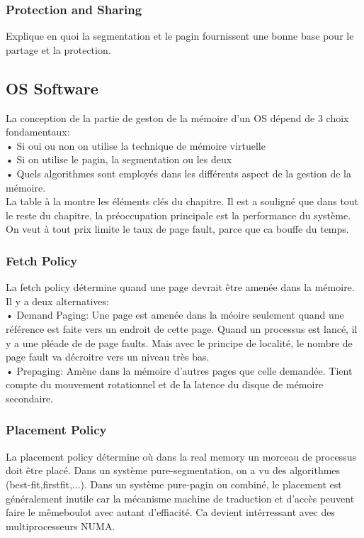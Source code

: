 \subsubsection{Protection and Sharing}
Explique en quoi la segmentation et le pagin fournissent une bonne base pour le partage et la protection.
\subsection{OS Software}
La conception de la partie de geston de la mémoire d'un OS dépend de 3 choix fondamentaux:\\
• Si oui ou non on utilise la technique de mémoire virtuelle\\
• Si on utilise le pagin, la segmentation ou les deux\\
• Quels algorithmes sont employés dans les différents aspect de la gestion de la mémoire.\\
La table à la \cite[p.~361]{stallings} montre les éléments clés du chapitre.
Il est a souligné que dans tout le reste du chapitre, la préoccupation principale est la performance du système.
On veut à tout prix limite le taux de page fault, parce que ca bouffe du temps.
\subsubsection{Fetch Policy}
La fetch policy détermine quand une page devrait être amenée dans la mémoire.
Il y a deux alternatives:\\
• Demand Paging: Une page est amenée dans la méoire seulement quand une référence est faite vers un endroit de cette page.
Quand un processus est lancé, il y a une pléade de de page faults.
Mais avec le principe de localité, le nombre de page fault va décroitre vers un niveau très bas.\\
• Prepaging: Amène dans la mémoire d'autres pages que celle demandée.
Tient compte du mouvement rotationnel et de la latence du disque de mémoire secondaire.\\
\subsubsection{Placement Policy}
La placement policy détermine où dans la real memory un morceau de processus doit être placé.
Dans un système pure-segmentation, on a vu des algorithmes (best-fit,firstfit,...).
Dans un système pure-pagin ou combiné, le placement est généralement inutile car la mécanisme machine de traduction et d'accès peuvent faire le mêmeboulot avec autant d'effiacité.
Ca devient intérressant avec des multiprocesseurs NUMA.
